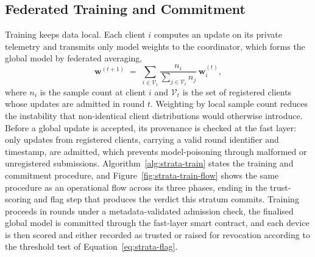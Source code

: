 \subsection{Federated Training and Commitment}
\label{subsec:strata-fedtrain}
Training keeps data local. Each client $i$ computes an update on its private telemetry and transmits only model weights to the coordinator, which forms the global model by federated averaging,
\begin{equation}
\label{eq:strata-fedavg}
\mathbf{w}^{(t+1)} \;=\; \sum_{i\in\mathcal{V}_t} \frac{n_i}{\sum_{j\in\mathcal{V}_t} n_j}\, \mathbf{w}_i^{(t)},
\end{equation}
where $n_i$ is the sample count at client $i$ and $\mathcal{V}_t$ is the set of registered clients whose updates are admitted in round $t$.
Weighting by local sample count reduces the instability that non-identical client distributions would otherwise introduce. Before a global update is accepted, its provenance is checked at the fast layer: only updates from registered clients, carrying a valid round identifier and timestamp, are admitted, which prevents model-poisoning through malformed or unregistered submissions. Algorithm~\ref{alg:strata-train} states the training and commitment procedure, and Figure~\ref{fig:strata-train-flow} shows the same procedure as an operational flow across its three phases, ending in the trust-scoring and flag step that produces the verdict this stratum commits. Training proceeds in rounds under a metadata-validated admission check, the finalised global model is committed through the fast-layer smart contract, and each device is then scored and either recorded as trusted or raised for revocation according to the threshold test of Equation~\eqref{eq:strata-flag}.

